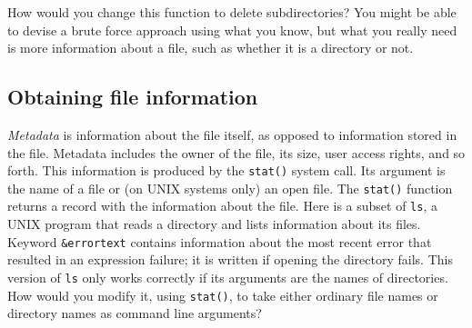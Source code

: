 
How would you change this function to delete subdirectories? You might
be able to devise a brute force approach using what you know, but what
you really need is more information about a file, such as whether it is
a directory or not.

\subsection{Obtaining file information}

\textit{Metadata} is information about the file
itself, as opposed to information stored in the file. Metadata includes
the owner of the file, its size, user access rights,
and so forth. This information is produced by the
\texttt{stat()} system call. Its argument is the name of
a file or (on UNIX systems only) an open file. The \texttt{stat()}
function returns a record with the information about the file. Here is
a subset of \texttt{ls}, a UNIX program that reads a directory and
lists information about its files. Keyword \texttt{\&errortext} contains information about the
most recent error that resulted in an expression
failure; it is written if opening the directory
fails. This version of \texttt{ls} only works correctly if its
arguments are the names of directories. How would you modify it, using
\texttt{stat()}, to take either ordinary file names or directory names
as command line arguments?

